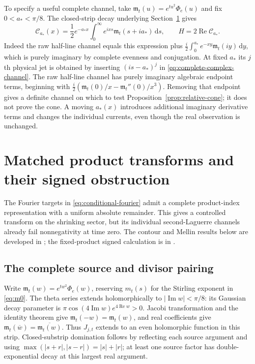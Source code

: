 \documentclass[11pt]{article}
\theoremstyle{definition}
\theoremstyle{remark}
\newcommand{\dd}{\,\mathrm d}
\newcommand{\Rea}{\operatorname{Re}}
\newcommand{\Ima}{\operatorname{Im}}
\begin{document}
To specify a useful complete channel, take
$\mathfrak m_t(u)=e^{tu^2}\Phi_e(u)$ and fix $0<a_*<\pi/8$.
The closed-strip decay underlying Section~\ref{pair-sec}
gives
\begin{equation}
 \mathcal C_{a_*}(x)=\frac12e^{-a_*x}
 \int_0^\infty e^{ixs}\mathfrak m_t(s+ia_*)\dd s,\qquad
 H=2\Rea\mathcal C_{a_*}.
 \label{eq:complete-complex-channel}
\end{equation}
Indeed the raw half-line channel equals this expression plus
$\frac i2\int_0^{a_*}e^{-xy}\mathfrak m_t(iy)\dd y$,
which is purely imaginary by complete evenness and conjugation.
At fixed $a_*$ its $j$th physical jet is obtained by inserting
$(is-a_*)^j$ in \eqref{eq:complete-complex-channel}.
The raw half-line channel has purely imaginary algebraic endpoint
terms, beginning with
$\frac i2(\mathfrak m_t(0)/x-\mathfrak m_t''(0)/x^3)$.
Removing that endpoint gives a definite channel on which to test
Proposition~\ref{prop:relative-cone}; it does not prove the cone.
A moving $a_*(x)$ introduces additional imaginary derivative terms
and changes the individual currents, even though the real observation
is unchanged.


\section{Matched product transforms and their signed obstruction}
\label{pair-sec}

The Fourier targets in \eqref{eq:conditional-fourier} admit a complete
product-index representation with a uniform absolute remainder.
This gives a controlled transform on the shrinking sector, but its
individual second-Laguerre channels already fail nonnegativity at time zero.
The contour and Mellin results below are developed in
\cite{pairedcontinuation}; the fixed-product signed calculation is in
\cite{signedcontinuation}.

\subsection{The complete source and divisor pairing}

Write $\mathfrak m_t(w)=e^{tw^2}\Phi_e(w)$, reserving $m_t(s)$ for the
Stirling exponent in \eqref{eq:m0}. The theta series extends
holomorphically to $|\Ima w|<\pi/8$: its Gaussian decay parameter is
$\pi\cos(4\Ima w)e^{4\Rea w}>0$.
Jacobi transformation and the identity theorem give
$\mathfrak m_t(-w)=\mathfrak m_t(w)$, and real coefficients give
$\mathfrak m_t(\overline w)=\overline{\mathfrak m_t(w)}$.
Thus $J_{j,t}$ extends to an even holomorphic function in this strip.
Closed-substrip domination follows by reflecting each source argument
and using
$\max(|s+r|,|s-r|)=|s|+|r|$; at least one source factor has
double-exponential decay at this largest real argument.
\end{document}
